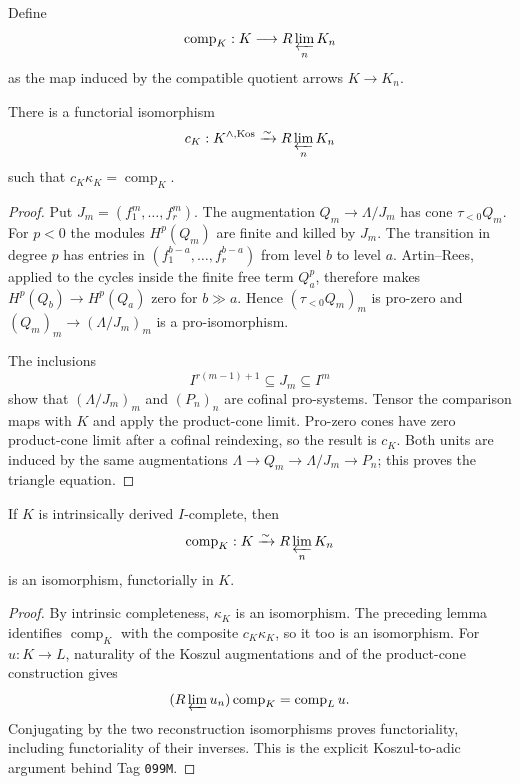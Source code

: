 \begin{definition}
\label{def:weil-pbc-completion-map}
Define
\[
 \operatorname{comp}_K:K\longrightarrow R\varprojlim_nK_n
\]
as the map induced by the compatible quotient arrows $K\to K_n$.
\end{definition}

\begin{lemma}
\label{lemma:weil-pbc-koszul-quotient-limit}
There is a functorial isomorphism
\[
 c_K:K^{\wedge,\mathrm{Kos}}\xrightarrow{\sim}
 R\varprojlim_nK_n
\]
such that $c_K\kappa_K=\operatorname{comp}_K$.
\end{lemma}
\begin{proof}
Put $J_m=(f_1^m,\ldots,f_r^m)$.  The augmentation
$Q_m\to\Lambda/J_m$ has cone $\tau_{<0}Q_m$.  For $p<0$ the modules
$H^p(Q_m)$ are finite and killed by $J_m$.  The transition in degree $p$
has entries in $(f_1^{b-a},\ldots,f_r^{b-a})$ from level $b$ to level $a$.
Artin--Rees, applied to the cycles inside the finite free term $Q_a^p$,
therefore makes $H^p(Q_b)\to H^p(Q_a)$ zero for $b\gg a$.  Hence
$(\tau_{<0}Q_m)_m$ is pro-zero and
$(Q_m)_m\to(\Lambda/J_m)_m$ is a pro-isomorphism.

The inclusions
\[
 I^{r(m-1)+1}\subseteq J_m\subseteq I^m
\]
show that $(\Lambda/J_m)_m$ and $(P_n)_n$ are cofinal pro-systems.  Tensor
the comparison maps with $K$ and apply the product-cone limit.  Pro-zero
cones have zero product-cone limit after a cofinal reindexing, so the result
is $c_K$.  Both units are induced by the same augmentations
$\Lambda\to Q_m\to\Lambda/J_m\to P_n$; this proves the triangle equation.
\end{proof}

\begin{lemma}
\label{lemma:weil-pbc-derived-complete-reconstruction}
If $K$ is intrinsically derived $I$-complete, then
\[
 \operatorname{comp}_K:K\xrightarrow{\sim}R\varprojlim_nK_n
\]
is an isomorphism, functorially in $K$.
\end{lemma}
\begin{proof}

By intrinsic completeness, $\kappa_K$ is an isomorphism.  The preceding
lemma identifies $\operatorname{comp}_K$ with the composite
$c_K\kappa_K$, so it too is an isomorphism.  For $u:K\to L$, naturality of
the Koszul augmentations and of the product-cone construction gives
\[
 (R\varprojlim u_n)\operatorname{comp}_K
 =\operatorname{comp}_Lu.
\]
Conjugating by the two reconstruction isomorphisms proves functoriality,
including functoriality of their inverses.  This is the explicit
Koszul-to-adic argument behind Tag \texttt{099M}.
\end{proof}

